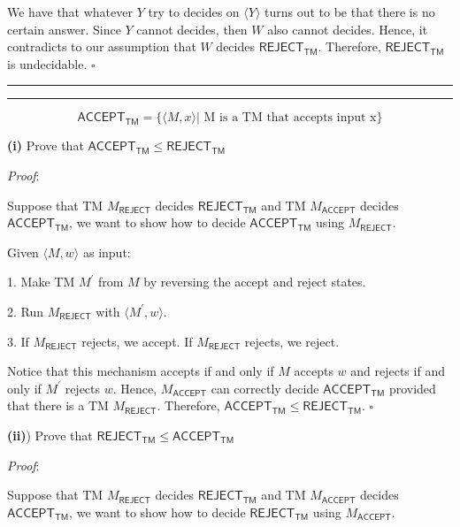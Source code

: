 \documentclass[a4paper, 11pt]{article}
\newcommand{\question}[2] {\vspace{.25in} \hrule\vspace{0.5em}
	\noindent{\bf #1: #2} \vspace{0.5em}
	\hrule \vspace{.10in}}
\renewcommand{\part}[1] {\vspace{.10in} {\bf (#1)}}
\begin{document}
	We have that whatever $Y$ try to decides on $\langle Y\rangle$ turns out to be that there is no certain answer. Since $Y$ cannot decides, then $W$ also cannot decides. Hence, it contradicts to our assumption that $W$ decides	$\textsf{REJECT}_{\textsf{TM}}$. Therefore, $\textsf{REJECT}_{\textsf{TM}}$ is undecidable. $\square$
		
	\question{2}{Accept vs. Reject} %
	
	$$ \textsf{ACCEPT}_{\textsf{TM}} = \{\langle M , x \rangle | \text{ M is a TM that accepts input x} \} $$
	
	\part{i} Prove that $\textsf{ACCEPT}_{\textsf{TM}} \leq \textsf{REJECT}_{\textsf{TM}} $
	
	{\em Proof}: 
	
	Suppose that TM $M_{\textsf{REJECT}}$ decides $\textsf{REJECT}_{\textsf{TM}}$ and TM $M_{\textsf{ACCEPT}}$ decides $\textsf{ACCEPT}_{\textsf{TM}}$, we want to show how to decide $\textsf{ACCEPT}_{\textsf{TM}}$ using $M_{\textsf{REJECT}}$.
	
	Given $\langle M, w \rangle$ as input:
	
	1. Make TM $M^\prime$ from $M$ by reversing the accept and reject states.
	
	2. Run $M_{\textsf{REJECT}}$ with $\langle M^\prime, w \rangle$.
	
	3. If $M_{\textsf{REJECT}}$ rejects, we accept. If $M_{\textsf{REJECT}}$ rejects, we reject.
	
	Notice that this mechanism accepts if and only if $M$ accepts $w$ and rejects if and only if $M^\prime$ rejects $w$. Hence, $M_{\textsf{ACCEPT}}$ can correctly decide $\textsf{ACCEPT}_{\textsf{TM}}$ provided that there is a TM $M_{\textsf{REJECT}}$. Therefore, $\textsf{ACCEPT}_{\textsf{TM}} \leq \textsf{REJECT}_{\textsf{TM}} $. $\square$
	
	\part{ii}) Prove that $\textsf{REJECT}_{\textsf{TM}} \leq \textsf{ACCEPT}_{\textsf{TM}} $
	
	
	{\em Proof}: 
	
	Suppose that TM $M_{\textsf{REJECT}}$ decides $\textsf{REJECT}_{\textsf{TM}}$ and TM $M_{\textsf{ACCEPT}}$ decides $\textsf{ACCEPT}_{\textsf{TM}}$, we want to show how to decide $\textsf{REJECT}_{\textsf{TM}}$ using $M_{\textsf{ACCEPT}}$.
	
\end{document}
